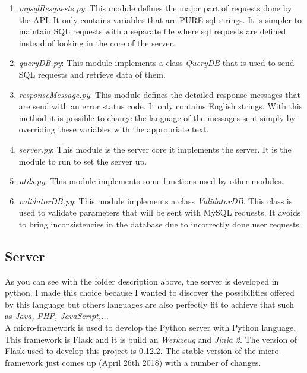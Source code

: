 
\begin{enumerate}
\item \textit{mysqlResquests.py}: This module defines the major part of requests done by the API. It only contains variables that are PURE sql strings. It is simpler to maintain SQL requests with a separate file where sql requests are defined instead of looking in the core of the server.
\item \textit{queryDB.py}: This module implements a class \textit{QueryDB} that is used to send SQL requests and retrieve data of them.
\item \textit{responseMessage.py}: This module defines the detailed response messages that are send with an error status code. It only contains English strings. With this method it is possible to change the language of the messages sent simply by overriding these variables with the appropriate text.
\item \textit{server.py}: This module is the server core it implements the server. It is the module to run to set the server up.
\item \textit{utils.py}: This module implements some functions used by other modules. 
\item \textit{validatorDB.py}: This module implements a class \textit{ValidatorDB}. This class is used to validate parameters that will be sent with MySQL requests. It avoids to bring inconsistencies in the database due to incorrectly done user requests.
\end{enumerate}
\subsection{Server}
As you can see with the folder description above, the server is developed in python. I made this choice because I wanted to discover the possibilities offered by this language but others languages are also perfectly fit to achieve that such as \textit{Java, PHP, JavaScript,...}\\

A micro-framework is used to develop the Python server with Python language. This framework is Flask and it is build an \textit{Werkzeug} and \textit{Jinja 2}. The version of Flask used to develop this project is 0.12.2. The stable version of the micro-framework just comes up (April 26th 2018) with a number of changes. \\

